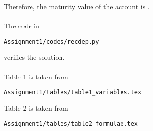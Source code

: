\documentclass[journal,12pt,twocolumn]{IEEEtran}
\begin{document}
Therefore, the maturity value of the account is .\\
\\
The code in
\begin{lstlisting}
Assignment1/codes/recdep.py
\end{lstlisting}
verifies the solution.\\
\\
Table 1 is taken from
\begin{lstlisting}
Assignment1/tables/table1_variables.tex
\end{lstlisting}
Table 2 is taken from
\begin{lstlisting}
Assignment1/tables/table2_formulae.tex
\end{lstlisting}
\end{document}
